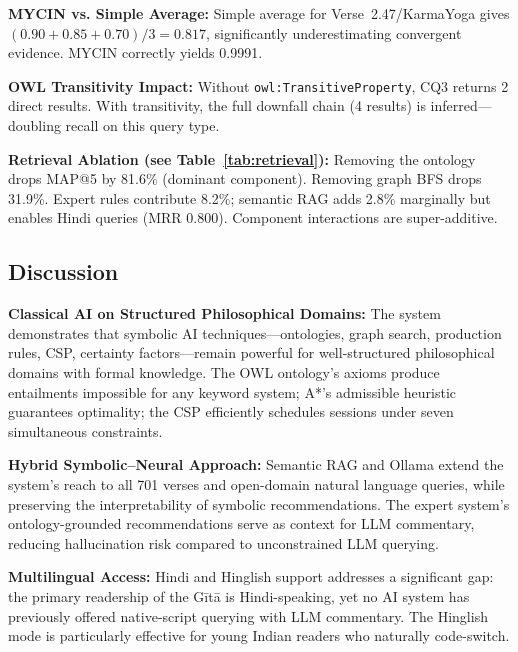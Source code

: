 \documentclass[conference]{IEEEtran}
\begin{document}
\textbf{MYCIN vs. Simple Average:} Simple average for Verse~2.47/KarmaYoga
gives $(0.90 + 0.85 + 0.70)/3 = 0.817$, significantly underestimating
convergent evidence. MYCIN correctly yields 0.9991.

\textbf{OWL Transitivity Impact:} Without \texttt{owl:TransitiveProperty},
CQ3 returns 2 direct results. With transitivity, the full downfall chain
(4 results) is inferred—doubling recall on this query type.

\textbf{Retrieval Ablation (see Table~\ref{tab:retrieval}):} Removing the ontology
drops MAP@5 by 81.6\% (dominant component). Removing graph BFS drops 31.9\%.
Expert rules contribute 8.2\%; semantic RAG adds 2.8\% marginally but enables
Hindi queries (MRR 0.800). Component interactions are super-additive.

\subsection{Discussion}

\textbf{Classical AI on Structured Philosophical Domains:} The system
demonstrates that symbolic AI techniques—ontologies, graph search, production
rules, CSP, certainty factors—remain powerful for well-structured philosophical
domains with formal knowledge. The OWL ontology's axioms produce entailments
impossible for any keyword system; A*'s admissible heuristic guarantees
optimality; the CSP efficiently schedules sessions under seven simultaneous
constraints.

\textbf{Hybrid Symbolic--Neural Approach:} Semantic RAG and Ollama extend the
system's reach to all 701 verses and open-domain natural language queries, while
preserving the interpretability of symbolic recommendations. The expert system's
ontology-grounded recommendations serve as context for LLM commentary, reducing
hallucination risk compared to unconstrained LLM querying.

\textbf{Multilingual Access:} Hindi and Hinglish support addresses a significant
gap: the primary readership of the G\={i}t\={a} is Hindi-speaking, yet no AI system
has previously offered native-script querying with LLM commentary. The Hinglish
mode is particularly effective for young Indian readers who naturally code-switch.
\end{document}
